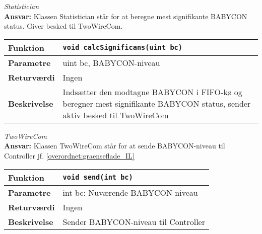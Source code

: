 \textit{Statistician} \\
\textbf{Ansvar:} Klassen Statistician står for at beregne mest signifikante BABYCON status. Giver besked til TwoWireCom. 

\begin{center}
    \begin{tabular}{ | l | p{} |}
    \hline
    \textbf{Funktion}	& \verb+void calcSignificans(uint bc) +						\\ \hline
    \textbf{Parametre} 	& uint bc, BABYCON-niveau		\\ \hline
    \textbf{Returværdi}	& Ingen	 								\\ \hline
    \textbf{Beskrivelse}& Indsætter den modtagne BABYCON i FIFO-kø og beregner mest signifikante BABYCON status, sender aktiv besked til TwoWireCom		\\ \hline
    \end{tabular}
\end{center}


\textit{TwoWireCom} \\
\textbf{Ansvar:} Klassen TwoWireCom står for at sende BABYCON-niveau til Controller jf. \ref{overordnet:graenseflade_IL}

\begin{center}
    \begin{tabular}{ | l | p{} |}
    \hline
    \textbf{Funktion}	& \verb+void send(int bc) +						\\ \hline
    \textbf{Parametre} 	& int bc: Nuværende BABYCON-niveau			\\ \hline
    \textbf{Returværdi}	& Ingen	 								\\ \hline
    \textbf{Beskrivelse}& Sender BABYCON-niveau til Controller		\\ \hline
    \end{tabular}
\end{center}


